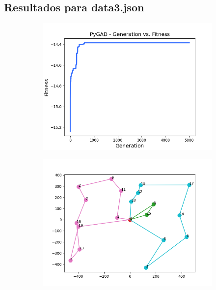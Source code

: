 \documentclass[12pt]{llncs}
\begin{document}
\subsection*{Resultados para data3.json}
    
\begin{figure}[!ht]
    \centering
    \begin{subfigure}[b]{0.496\linewidth}
      \includegraphics[width=\linewidth]{../../images/data3-training.png}
    \end{subfigure}
    \begin{subfigure}[b]{0.496\linewidth}
      \includegraphics[width=\linewidth]{../../images/data3-graph.png}
    \end{subfigure}
    \label{fig:data3}
\end{figure}
\end{document}
